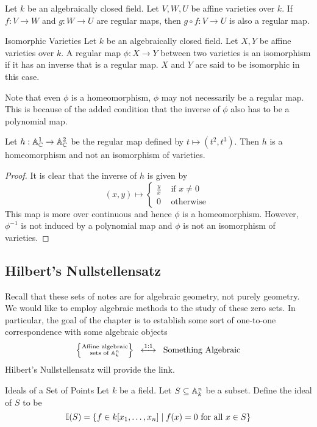 \documentclass[a4paper]{article}
\begin{document}
\begin{prp}{}{} Let $k$ be an algebraically closed field. Let $V,W,U$ be affine varieties over $k$. If $f:V\to W$ and $g:W\to U$ are regular maps, then $g\circ f:V\to U$ is also a regular map. 
\end{prp}

\begin{defn}{Isomorphic Varieties}{} Let $k$ be an algebraically closed field. Let $X,Y$ be affine varieties over $k$. A regular map $\phi:X\to Y$ between two varieties is an isomorphism if it has an inverse that is a regular map. $X$ and $Y$ are said to be isomorphic in this case. 
\end{defn}

Note that even $\phi$ is a homeomorphism, $\phi$ may not necessarily be a regular map. This is because of the added condition that the inverse of $\phi$ also has to be a polynomial map. 

\begin{eg}{}{} Let $h:\mathbb{A}_{\mathbb{C}}^1\to\mathbb{A}_{\mathbb{C}}^2$ be the regular map defined by $t\mapsto(t^2,t^3)$. Then $h$ is a homeomorphism and not an isomorphism of varieties. \tcbline
\begin{proof}
It is clear that the inverse of $h$ is given by $$(x,y)\mapsto\begin{cases}
\frac{y}{x} & \text{ if }x\neq 0\\
0 & \text{ otherwise }
\end{cases}$$ This map is more over continuous and hence $\phi$ is a homeomorphism. However, $\phi^{-1}$ is not induced by a polynomial map and $\phi$ is not an isomorphism of varieties. 
\end{proof}
\end{eg}

\subsection{Hilbert's Nullstellensatz}
Recall that these sets of notes are for algebraic geometry, not purely geometry. We would like to employ algebraic methods to the study of these zero sets. In particular, the goal of the chapter is to establish some sort of one-to-one correspondence with some algebraic objects $$\left\{\substack{\text{Affine algebraic}\\\text{sets of }\mathbb{A}_k^n}\right\}\;\;\overset{1:1}{\longleftrightarrow}\;\;\text{Something Algebraic}$$ Hilbert's Nullstellensatz will provide the link. 

\begin{defn}{Ideals of a Set of Points}{} Let $k$ be a field. Let $S\subseteq\mathbb{A}_k^n$ be a subset. Define the ideal of $S$ to be $$\mathbb{I}(S)=\{f\in k[x_1,\dots,x_n]\;|\;f(x)=0\text{ for all }x\in S\}$$ 
\end{defn}
\end{document}
